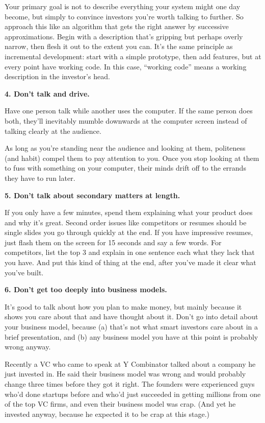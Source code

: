 \documentclass[12pt]{book}
\begin{document}
Your primary goal is not to describe everything your system might one
day become, but simply to convince investors you're worth talking to
further. So approach this like an algorithm that gets the right answer
by successive approximations. Begin with a description that's gripping
but perhaps overly narrow, then flesh it out to the extent you can. It's
the same principle as incremental development: start with a simple
prototype, then add features, but at every point have working code. In
this case, ``working code'' means a working description in the
investor's head.

\textbf{4. Don't talk and drive.}

Have one person talk while another uses the computer. If the same person
does both, they'll inevitably mumble downwards at the computer screen
instead of talking clearly at the audience.

As long as you're standing near the audience and looking at them,
politeness (and habit) compel them to pay attention to you. Once you
stop looking at them to fuss with something on your computer, their
minds drift off to the errands they have to run later.

\textbf{5. Don't talk about secondary matters at length.}

If you only have a few minutes, spend them explaining what your product
does and why it's great. Second order issues like competitors or resumes
should be single slides you go through quickly at the end. If you have
impressive resumes, just flash them on the screen for 15 seconds and say
a few words. For competitors, list the top 3 and explain in one sentence
each what they lack that you have. And put this kind of thing at the
end, after you've made it clear what you've built.

\textbf{6. Don't get too deeply into business models.}

It's good to talk about how you plan to make money, but mainly because
it shows you care about that and have thought about it. Don't go into
detail about your business model, because (a) that's not what smart
investors care about in a brief presentation, and (b) any business model
you have at this point is probably wrong anyway.

Recently a VC who came to speak at Y Combinator talked about a company
he just invested in. He said their business model was wrong and would
probably change three times before they got it right. The founders were
experienced guys who'd done startups before and who'd just succeeded in
getting millions from one of the top VC firms, and even their business
model was crap. (And yet he invested anyway, because he expected it to
be crap at this stage.)
\end{document}
